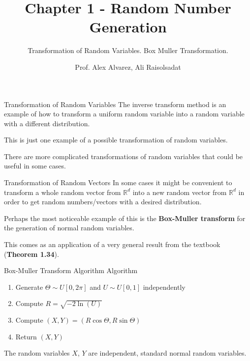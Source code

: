 \documentclass[8pt]{beamer}
\title{Chapter 1 - Random Number Generation}
\subtitle{Transformation of Random Variables. Box Muller Transformation.}
\author{Prof. Alex Alvarez, Ali Raisolsadat}
\institute{School of Mathematical and Computational Sciences \\ University of Prince Edward Island}
\date{} %
\begin{document}
\maketitle

\begin{frame}{Transformation of Random Variables}
The inverse transform method is an example of how to transform a uniform random variable into a random variable with a different distribution. 

\vspace{2mm}

This is just one example of a possible transformation of random variables. 

\vspace{2mm}

There are more complicated transformations of random variables
that could be useful in some cases.
\end{frame}

\begin{frame}{Transformation of Random Vectors}
In some cases it might be convenient to transform a whole random vector from $\mathbb{R}^d$ into a new random vector from $\mathbb{R}^d$
in order to get random numbers/vectors with a desired distribution.

\vspace{2mm}

Perhaps the most noticeable example of this is the \textbf{Box-Muller transform} for the generation of normal random variables.

\vspace{2mm}

This comes as an application of a very general result from the textbook (\textbf{Theorem 1.34}).
\end{frame}

\begin{frame}{Box-Muller Transform Algorithm}
\alert{Algorithm}  

\begin{enumerate}
	\item Generate $\Theta \sim U[0,2\pi]$ and $U\sim U[0,1]$ independently
	\item Compute $R=\sqrt{-2\ln(U)}$
	\item Compute $(X,Y)=(R \cos \Theta  , R \sin \Theta)$
	\item Return $(X,Y)$
\end{enumerate}
The random variables $X$, $Y$ are independent, standard normal random variables.
\end{frame}
\end{document}
